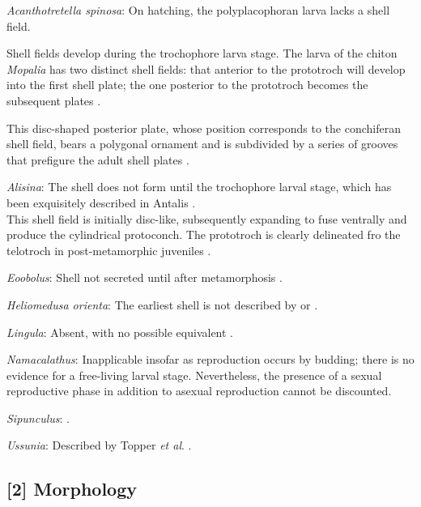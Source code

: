 \documentclass[openany]{book}
\theoremstyle{definition}
\theoremstyle{definition}
\theoremstyle{definition}
\theoremstyle{remark}
\begin{document}
\hypertarget{Acanthotretella_spinosa-coding-1}{}
\emph{Acanthotretella spinosa}: On hatching, the polyplacophoran larva
lacks a shell field.

Shell fields develop during the trochophore larva stage. The larva of
the chiton \emph{Mopalia} has two distinct shell fields: that anterior
to the prototroch will develop into the first shell plate; the one
posterior to the prototroch becomes the subsequent plates
\citep{Wanninger2002C}.

This disc-shaped posterior plate, whose position corresponds to the
conchiferan shell field, bears a polygonal ornament and is subdivided by
a series of grooves that prefigure the adult shell plates
\citep{Wanninger2002C}.

\hypertarget{Alisina-coding-1}{}
\emph{Alisina}: The shell does not form until the trochophore larval
stage, which has been exquisitely described in Antalis
\citep{Wanninger2001}.\\
This shell field is initially disc-like, subsequently expanding to fuse
ventrally and produce the cylindrical protoconch. The prototroch is
clearly delineated fro the telotroch in post-metamorphic juveniles
\citep{Wanninger2001}.

\hypertarget{Eoobolus-coding-1}{}
\emph{Eoobolus}: Shell not secreted until after metamorphosis
\citep{Popov2010Earliestontogeny}.

\hypertarget{Heliomedusa_orienta-coding-1}{}
\emph{Heliomedusa orienta}: The earliest shell is not described by
\citet{Hanken1985Thetaxonomy} or \citet{Watkins2002Newrecord}.

\hypertarget{Lingula-coding-1}{}
\emph{Lingula}: Absent, with no possible equivalent \citep{Nielsen1966}.

\hypertarget{Namacalathus-coding-1}{}
\emph{Namacalathus}: Inapplicable insofar as reproduction occurs by
budding; there is no evidence for a free-living larval stage.
Nevertheless, the presence of a sexual reproductive phase in addition to
asexual reproduction cannot be discounted.

\hypertarget{Sipunculus-coding-1}{}
\emph{Sipunculus}: \citet{Reed1982}.

\hypertarget{Ussunia-coding-1}{}
\emph{Ussunia}: Described by Topper \emph{et al}.
\citeyearpar{Topper2013Reappraisalof}.

\subsection*{{[}2{]} Morphology}\label{morphology}
\end{document}
